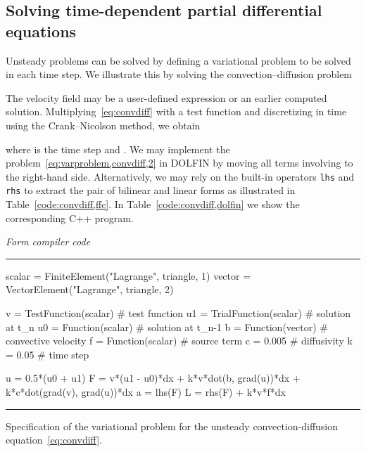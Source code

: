 \documentclass[acmtoms]{acmtrans2m}
\newenvironment{ffccode}[1]{\center\minipage{#1\textwidth}\footnotesize\hfill\it Form compiler code \rm\vspace{0.1cm}\hrule\renewcommand{\baselinestretch}{0.9}\footnotesize\verbatim}{\endverbatim\hrule\normalsize\endminipage\newline\endcenter}
\newcommand{\emp}[1]{\texttt{#1}}
\newcommand{\dolfin}{DOLFIN}
\begin{document}
\subsection{Solving time-dependent partial differential equations}
\label{sec:convection-diffusion}
Unsteady problems can be solved by defining a variational problem to
be solved in each time step. We illustrate this by solving the
convection--diffusion problem

The velocity field  may be a user-defined expression or an
earlier computed solution. Multiplying~\eqref{eq:convdiff} with a test
function and discretizing in time using the Crank--Nicolson method,
we obtain

where  is the time step and
.  We may implement the
problem~\eqref{eq:varproblem,convdiff,2} in \dolfin{} by moving all
terms involving  to the right-hand side. Alternatively, we
may rely on the built-in operators \emp{lhs} and \emp{rhs} to
extract the pair of bilinear and linear forms as illustrated in
Table~\ref{code:convdiff,ffc}. In Table~\ref{code:convdiff,dolfin} we
show the corresponding C++ program.
\begin{table}
\begin{ffccode}{0.9}
scalar = FiniteElement("Lagrange", triangle, 1)
vector = VectorElement("Lagrange", triangle, 2)

v  = TestFunction(scalar)  # test function
u1 = TrialFunction(scalar) # solution at t_n
u0 = Function(scalar)      # solution at t_{n-1}
b  = Function(vector)      # convective velocity
f  = Function(scalar)      # source term
c  = 0.005                 # diffusivity
k  = 0.05                  # time step

u = 0.5*(u0 + u1)
F = v*(u1 - u0)*dx + k*v*dot(b, grad(u))*dx + k*c*dot(grad(v), grad(u))*dx
a = lhs(F)
L = rhs(F) + k*v*f*dx
\end{ffccode}
\caption{Specification of the variational problem for the unsteady
convection-diffusion equation~\eqref{eq:convdiff}.}
\label{code:convdiff,ffc}
\end{table}
\end{document}
